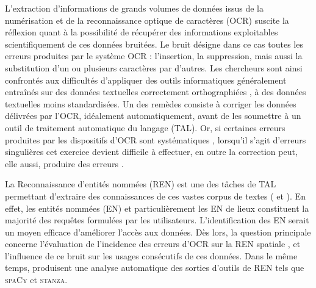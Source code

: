L’extraction d'informations de grands volumes de données issus de la numérisation et de la reconnaissance optique de caractères (OCR) suscite la réflexion quant à la possibilité de récupérer des informations exploitables scientifiquement de ces données bruitées. Le bruit désigne dans ce cas toutes les erreurs produites par le système OCR : l'insertion, la suppression, mais aussi la substitution d'un ou plusieurs caractères par d'autres. 
Les chercheurs sont ainsi confrontés aux difficultés d'appliquer des outils informatiques généralement entraînés sur des données textuelles correctement orthographiées \cite{https://doi.org/10.48550/arxiv.1706.09147}, à des données textuelles moins standardisées. 
Un des remèdes consiste à corriger les données délivrées par l'OCR, idéalement automatiquement, avant de les soumettre à un outil de traitement automatique du langage (TAL).
Or, si certaines erreurs produites par les dispositifs d'OCR sont systématiques \cite{stanislawek-2019}, lorsqu'il s’agit d’erreurs singulières cet exercice devient difficile à effectuer, en outre la correction peut, elle aussi, produire des erreurs \cite{huynh:hal-03034484}.
 
 
La Reconnaissance d'entités nommées (REN) est une des tâches de TAL permettant d'extraire des connaissances de ces vastes corpus de textes (\cite{chiron:hal-03025508} et \cite{linharespontes}). En effet, les entités nommées (EN) et particulièrement les EN de lieux \cite{vanStrien-2020} constituent la majorité des requêtes formulées par les utilisateurs. L’identification des EN serait un moyen efficace d’améliorer l’accès aux données. 
Dès lors, la question principale concerne l'évaluation de l'incidence des erreurs d'OCR sur la REN spatiale \cite{hamdi:hal-03026931}, et l'influence de ce bruit sur les usages consécutifs \cite{vanStrien-2020} de ces données. 
Dans le même temps, \cite{DBLP:conf/gis/Koudoro-Parfait21} produisent une analyse automatique des sorties d'outils de REN tels que \textsc{spaCy} \cite{honnibal2017spacy} et \textsc{stanza}\cite{qi2020stanza}.

